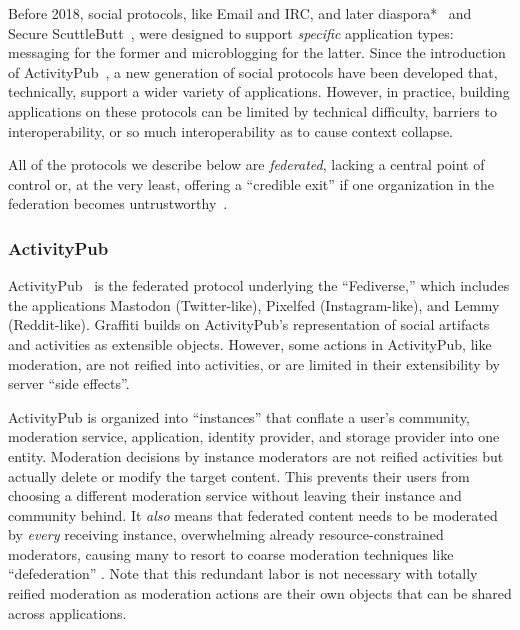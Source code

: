 Before 2018, social protocols, like Email and IRC,
and later diaspora*~\cite{diaspora} and Secure ScuttleButt~\cite{scuttlebutt},
were designed to support \emph{specific} application types:
messaging for the former and microblogging for the latter.
Since the introduction of ActivityPub~\cite{activitypub},
a new generation of social protocols have
been developed that, technically, support a wider variety of applications.
However, in practice,
building applications on these protocols can be limited by technical
difficulty, barriers to interoperability, or so much interoperability
as to cause context collapse.

All of the protocols we describe below are \emph{federated},
lacking a central point of control or,
at the very least, offering
a ``credible exit'' if one organization in the federation becomes
untrustworthy~\cite{howdecentralizedisbluesky}.

\subsubsection{ActivityPub}
\label{related-work:activitypub}

ActivityPub~\cite{activitypub} is the federated protocol underlying the
``Fediverse,'' which includes the applications
Mastodon (Twitter-like), Pixelfed (Instagram-like), and
Lemmy (Reddit-like).
Graffiti builds on ActivityPub's representation of social artifacts and
activities as extensible objects.
However, some actions in ActivityPub, like moderation, are not
reified into activities, or are
limited in their extensibility by server ``side effects''.

ActivityPub is organized into ``instances'' that conflate
a user's community, moderation service, application,
identity provider, and storage provider into one entity.
Moderation decisions by instance moderators are not reified activities
but actually delete or modify the target content.
This prevents their users from choosing a different moderation
service without leaving their instance and community
behind.
It \emph{also} means that federated content
needs to be moderated by \emph{every} receiving instance,
overwhelming already resource-constrained moderators, causing many
to resort to coarse moderation techniques like ``defederation''
\cite{securingfederatedplatforms, blocklistboundary}.
Note that this redundant labor is not necessary with totally
reified moderation as moderation actions are their own objects
that can be shared across applications.

